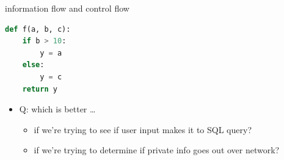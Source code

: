 \begin{frame}[fragile,label=infoFlowVControlFlow]{information flow and control flow}
\begin{lstlisting}[language=Python,style=smaller]
def f(a, b, c):
    if b > 10:
        y = a
    else:
        y = c
    return y
\end{lstlisting}
\begin{itemize}
\item Q: which is better \ldots
    \begin{itemize}
    \item if we're trying to see if user input makes it to SQL query?
    \item if we're trying to determine if private info goes out over network?
    \end{itemize}
\end{itemize}
\end{frame}
